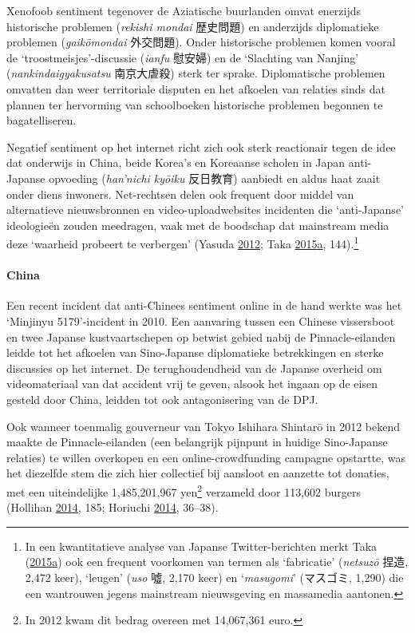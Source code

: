 \documentclass[10.5pt,dutch,]{article}
\let\oldparagraph\paragraph
\renewcommand{\paragraph}[1]{\oldparagraph{#1}\mbox{}}
\begin{document}
Xenofoob sentiment tegenover de Aziatische buurlanden omvat enerzijds
historische problemen (\emph{rekishi mondai} 歴史問題) en anderzijds
diplomatieke problemen (\emph{gaikōmondai} 外交問題). Onder historische
problemen komen vooral de `troostmeisjes'-discussie (\emph{ianfu}
慰安婦) en de `Slachting van Nanjing' (\emph{nankindaigyakusatsu}
南京大虐殺) sterk ter sprake. Diplomatische problemen omvatten dan weer
territoriale disputen en het afkoelen van relaties sinds dat plannen ter
hervorming van schoolboeken historische problemen begonnen te
bagatelliseren.

Negatief sentiment op het internet richt zich ook sterk reactionair
tegen de idee dat onderwijs in China, beide Korea's en Koreaanse scholen
in Japan anti-Japanse opvoeding (\emph{han'nichi kyōiku} 反日教育)
aanbiedt en aldus haat zaait onder diens inwoners. Net-rechtsen delen
ook frequent door middel van alternatieve nieuwsbronnen en
video-uploadwebsites incidenten die `anti-Japanse' ideologieën zouden
meedragen, vaak met de boodschap dat mainstream media deze `waarheid
probeert te verbergen' (Yasuda
\protect\hyperlink{ref-yasudaux5fnettoux5f2012}{2012}; Taka
\protect\hyperlink{ref-takaux5ftwitterux5f2015-1}{2015}\protect\hyperlink{ref-takaux5ftwitterux5f2015-1}{a},
144).\footnote{In een kwantitatieve analyse van Japanse
  Twitter-berichten merkt Taka
  (\protect\hyperlink{ref-takaux5ftwitterux5f2015-1}{2015}\protect\hyperlink{ref-takaux5ftwitterux5f2015-1}{a})
  ook een frequent voorkomen van termen als `fabricatie' (\emph{netsuzō}
  捏造, 2,472 keer), `leugen' (\emph{uso} 噓, 2,170 keer) en
  `\emph{masugomi}' (マスゴミ, 1,290) die een wantrouwen jegens
  mainstream nieuwsgeving en massamedia aantonen.}

\paragraph{China}\label{china}

Een recent incident dat anti-Chinees sentiment online in de hand werkte
was het `Minjinyu 5179'-incident in 2010. Een aanvaring tussen een
Chinese vissersboot en twee Japanse kustvaartschepen op betwist gebied
nabij de Pinnacle-eilanden leidde tot het afkoelen van Sino-Japanse
diplomatieke betrekkingen en sterke discussies op het internet. De
terughoudendheid van de Japanse overheid om videomateriaal van dat
accident vrij te geven, alsook het ingaan op de eisen gesteld door
China, leidden tot ook antagonisering van de DPJ.

Ook wanneer toenmalig gouverneur van Tokyo Ishihara Shintarō in 2012
bekend maakte de Pinnacle-eilanden (een belangrijk pijnpunt in huidige
Sino-Japanse relaties) te willen overkopen en een online-crowdfunding
campagne opstartte, was het diezelfde stem die zich hier collectief bij
aansloot en aanzette tot donaties, met een uiteindelijke 1,485,201,967
yen\footnote{In 2012 kwam dit bedrag overeen met 14,067,361 euro.}
verzameld door 113,602 burgers (Hollihan
\protect\hyperlink{ref-hollihanux5fdisputeux5f2014}{2014}, 185; Horiuchi
\protect\hyperlink{ref-horiuchiux5fpublicux5f2014}{2014}, 36--38).
\end{document}
